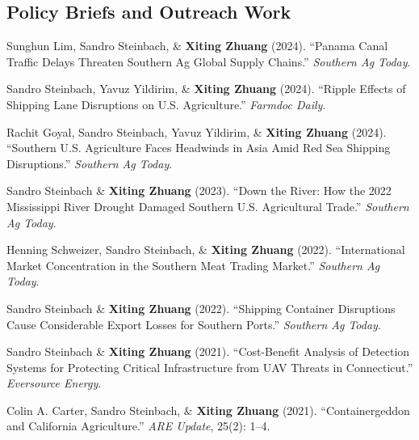 \documentclass[10.5pt,letterpaper]{article}
\renewenvironment{itemize}{
	\begin{list}{}{
			\setlength{\leftmargin}{1.5em}
		}
	}{
	\end{list}
}
\begin{document}
	\subsection*{\textbf{Policy Briefs and Outreach Work}}
	\begin{itemize}
		\item[-] Sunghun Lim, Sandro Steinbach, \& \textbf{Xiting Zhuang} (2024).  
		``Panama Canal Traffic Delays Threaten Southern Ag Global Supply Chains.''  
		\textit{Southern Ag Today}.
		
		\item[-] Sandro Steinbach, Yavuz Yildirim, \& \textbf{Xiting Zhuang} (2024).  
		``Ripple Effects of Shipping Lane Disruptions on U.S. Agriculture.''  
		\textit{Farmdoc Daily}.
		
		\item[-] Rachit Goyal, Sandro Steinbach, Yavuz Yildirim, \& \textbf{Xiting Zhuang} (2024).  
		``Southern U.S. Agriculture Faces Headwinds in Asia Amid Red Sea Shipping Disruptions.''  
		\textit{Southern Ag Today}.
		
		\item[-] Sandro Steinbach \& \textbf{Xiting Zhuang} (2023).  
		``Down the River: How the 2022 Mississippi River Drought Damaged Southern U.S. Agricultural Trade.''  
		\textit{Southern Ag Today}.
		
		\item[-] Henning Schweizer, Sandro Steinbach, \& \textbf{Xiting Zhuang} (2022).  
		``International Market Concentration in the Southern Meat Trading Market.''  
		\textit{Southern Ag Today}.
		
		\item[-] Sandro Steinbach \& \textbf{Xiting Zhuang} (2022).  
		``Shipping Container Disruptions Cause Considerable Export Losses for Southern Ports.''  
		\textit{Southern Ag Today}.
		
		\item[-] Sandro Steinbach \& \textbf{Xiting Zhuang} (2021).  
		``Cost-Benefit Analysis of Detection Systems for Protecting Critical Infrastructure from UAV Threats in Connecticut.''  
		\textit{Eversource Energy}.
		
		\item[-] Colin A. Carter, Sandro Steinbach, \& \textbf{Xiting Zhuang} (2021).  
		``Containergeddon and California Agriculture.''  
		\textit{ARE Update}, 25(2): 1–4.
	\end{itemize}
	
\end{document}
